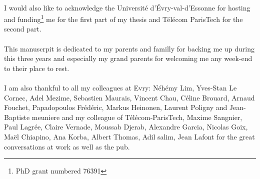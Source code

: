 \paragraph{}
I would also like to acknowledge the Universit\'e d'\'Evry-val-d'Essonne for
hosting and funding\footnote{PhD grant numbered 76391} me for the first part
of my thesis and T\'el\'ecom ParisTech for the second part.
\paragraph{}
This manuscrpit is dedicated to my parents and familly for backing me up during
this three years and especially my grand parents for welcoming me any week-end
to their place to rest.
\paragraph{}
I am also thankful to all my colleagues at Evry: N\'eh\'emy Lim, Yves-Stan Le
Cornec, Adel Mezime, Sebastien Maurais, Vincent Chau, C\'eline Brouard, Arnaud
Fouchet, Papadopoulos Fr\'ed\'eric, Markus Heinonen, Laurent Poligny and
Jean-Baptiste meuniere and my colleague of T\'el\'ecom-ParisTech, Maxime
Sangnier, Paul Lagr\'ee, Claire Vernade, Moussab Djerab, Alexandre Garcia,
Nicolas Goix, Ma\"el Chiapino, Ana Korba, Albert Thomas, Adil salim, Jean
Lafont for the great conversations at work as well as the pub.

\endgroup

\chapterend
